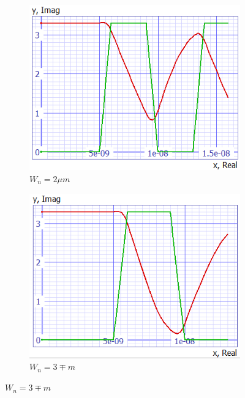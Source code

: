 \documentclass[../main.tex]{subfiles}
\begin{document}
{{			\begin{figure}[H]
				\centering
				\begin{subfigure}{0.3\textwidth}
					\centering
					\includegraphics[width=\textwidth]{plots/Q7_Wn2.png}
					\caption{$W_n = 2\mu m$}
					\label{fig:subfig1}
				\end{subfigure}
				\begin{subfigure}{0.3\textwidth}
					\centering
					\includegraphics[width=\textwidth]{plots/Q6_05pf.png}
					\caption{$W_n = 3\mp m$}
					\label{fig:subfig2}
				\end{subfigure}

\end{figure}}}
\end{document}
